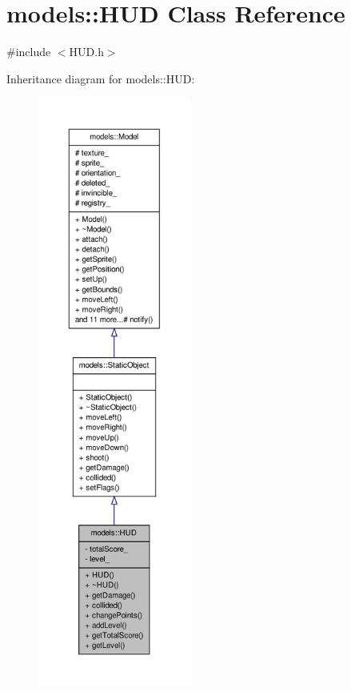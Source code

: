 \hypertarget{classmodels_1_1HUD}{\section{models\-:\-:\-H\-U\-D \-Class \-Reference}
\label{d6/dbb/classmodels_1_1HUD}
}


{\ttfamily \#include $<$\-H\-U\-D.\-h$>$}



\-Inheritance diagram for models\-:\-:\-H\-U\-D\-:\nopagebreak
\begin{figure}[H]
\begin{center}
\leavevmode
\includegraphics[height=550pt]{d2/db9/classmodels_1_1HUD__inherit__graph}
\end{center}
\end{figure}


